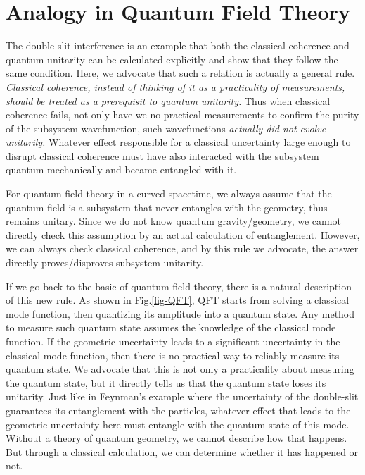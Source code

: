 \documentclass[aps,showpacs,onecolumn,floats,prd,superscriptaddress,nofootinbib]{revtex4-1}
\begin{document}
\section{Analogy in Quantum Field Theory}
\label{sec-QFT}

The double-slit interference is an example that both the classical coherence and quantum unitarity can be calculated explicitly and show that they follow the same condition.
Here, we advocate that such a relation is actually a general rule.
{\it Classical coherence, instead of thinking of it as a practicality of measurements, should be treated as a prerequisit to quantum unitarity.} 
Thus when classical coherence fails, not only have we no practical measurements to confirm the purity of the subsystem wavefunction, such wavefunctions {\it actually did not evolve unitarily.}
Whatever effect responsible for a classical uncertainty large enough to disrupt classical coherence must have also interacted with the subsystem quantum-mechanically and became entangled with it.

For quantum field theory in a curved spacetime, we always assume that the quantum field is a subsystem that never entangles with the geometry, thus remains unitary.
Since we do not know quantum gravity/geometry, we cannot directly check this assumption by an actual calculation of entanglement.
However, we can always check classical coherence, and by this rule we advocate, the answer directly proves/disproves subsystem unitarity.

If we go back to the basic of quantum field theory, there is a natural description of this new rule. 
As shown in Fig.\ref{fig-QFT}, QFT starts from solving a classical mode function, then quantizing its amplitude into a quantum state. 
Any method to measure such quantum state assumes the knowledge of the classical mode function. 
If the geometric uncertainty leads to a significant uncertainty in the classical mode function, then there is no practical way to reliably measure its quantum state. 
We advocate that this is not only a practicality about measuring the quantum state, but it directly tells us that the quantum state loses its unitarity. 
Just like in Feynman's example where the uncertainty of the double-slit guarantees its entanglement with the particles, whatever effect that leads to the geometric uncertainty here must entangle with the quantum state of this mode. 
Without a theory of quantum geometry, we cannot describe how that happens. 
But through a classical calculation, we can determine whether it has happened or not.
\end{document}
